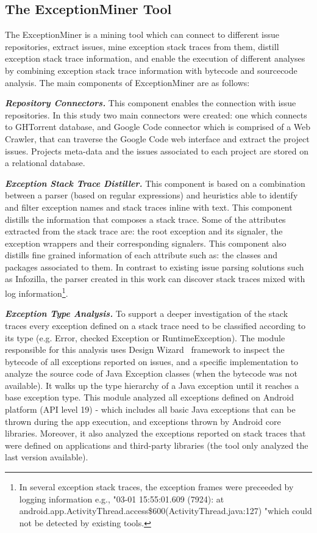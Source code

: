 \documentclass[conference]{IEEEtran}
\begin{document}
\subsection{The ExceptionMiner Tool}
\label{sec:exceptionminer}

The ExceptionMiner is a mining tool which can connect to different issue repositories, 
extract issues, mine exception stack traces from them, distill exception stack trace information,
and enable the execution of different analyses by combining exception stack 
trace information with bytecode and sourcecode analysis. The main components of ExceptionMiner are as follows:

\emph{\textbf{Repository Connectors.}} This component enables the connection 
with issue repositories. In this study two main connectors were created: one which connects to 
GHTorrent database, and Google Code connector which is comprised of a Web Crawler,
 that can traverse the Google Code web interface and extract the project issues. 
Projects meta-data and the issues associated to each project are stored on a relational 
database.

\emph{\textbf{Exception Stack Trace Distiller.}}
This component is based on a combination between a parser (based on regular expressions) 
and heuristics able to identify and filter exception names and stack traces inline with text. 
This component distills the information that composes a stack trace.
 Some of the attributes extracted from the stack trace are:
 the root exception and its signaler, the exception wrappers and their corresponding signalers. 
This component also distills fine grained information of each attribute such as: the classes and packages associated to them.
In contrast to existing issue parsing solutions such as Infozilla, the parser
created in this work can discover stack traces mixed with log information\footnote{In several 
exception stack traces, the exception frames were preceeded by logging information e.g., 
"03-01 15:55:01.609 (7924): at android.app.ActivityThread.access\$600(ActivityThread.java:127) 
"which could not be detected by existing tools.}.

\emph{\textbf{Exception Type Analysis.}} To support a deeper investigation of the 
stack traces every exception defined on a stack trace need to be classified according to its type
(e.g. Error, checked Exception or RuntimeException). The module responsible for this analysis 
uses Design Wizard~\cite{Brunet09} framework to inspect the bytecode of all exceptions reported on issues,
and a specific implementation to analyze the source code of Java Exception classes (when the
bytecode was not available). It walks up the type hierarchy of a Java exception until it reaches a base exception type.
This module analyzed all exceptions defined on Android platform (API level 19) - 
which includes all basic Java exceptions that can be thrown during the app execution,
and exceptions thrown by Android core libraries. Moreover, it also analyzed the 
exceptions reported on stack traces that were defined on applications and third-party libraries 
(the tool only analyzed the last version available).
\end{document}
